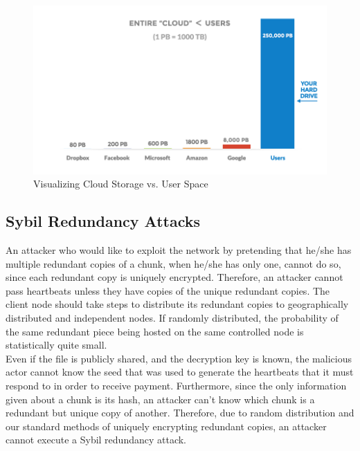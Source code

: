 \documentclass[a4paper,10pt]{article}
\begin{document}
\begin{figure}[h!]
\centering
\includegraphics[width=\linewidth]{9}
\caption{Visualizing Cloud Storage vs. User Space }
\end{figure}

\subsection{Sybil Redundancy Attacks}
An attacker who would like to exploit the network by pretending that he/she has multiple redundant copies of a chunk, when he/she has only one, cannot do so, since each redundant copy is uniquely encrypted. Therefore, an attacker cannot pass heartbeats unless they have copies of the unique redundant copies. The client node should take steps to distribute its redundant copies to geographically distributed and independent nodes. If randomly distributed, the probability of the same redundant piece being hosted on the same controlled node is statistically quite small.  \\

Even if the file is publicly shared, and the decryption key is known, the malicious actor cannot know the seed that was used to generate the heartbeats that it must respond to in order to receive payment. Furthermore, since the only information given about a chunk is its hash, an attacker can’t know which chunk is a redundant but unique copy of another. Therefore, due to random distribution and our standard methods of uniquely encrypting redundant copies, an attacker cannot execute a Sybil redundancy attack.   
\end{document}
